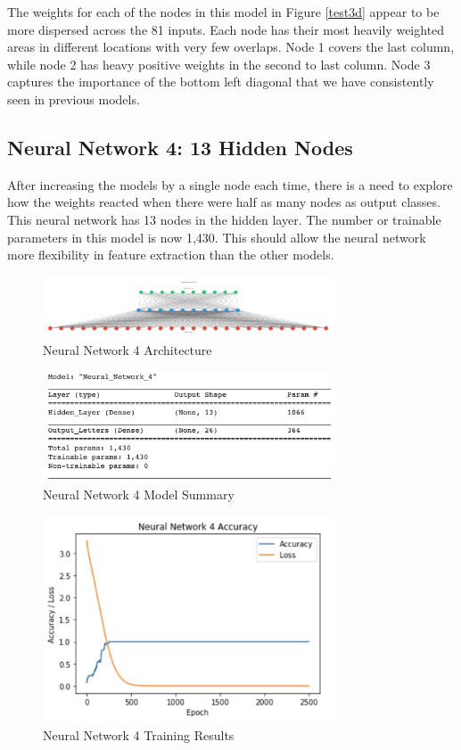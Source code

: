 \documentclass[5p,authoryear]{elsarticle}
\begin{document}
The weights for each of the nodes in this model in Figure \ref{test3d} appear to be more dispersed across the 81 inputs. 
Each node has their most heavily weighted areas in different locations with very few overlaps. 
Node 1 covers the last column, while node 2 has heavy positive weights in the second to last column. 
Node 3 captures the importance of the bottom left diagonal that we have consistently seen in previous models. 


\subsection{Neural Network 4: 13 Hidden Nodes}\label{one}

After increasing the models by a single node each time, there is a need to explore how the weights reacted when there were half as many nodes as output classes. 
This neural network has 13 nodes in the hidden layer. 
The number or trainable parameters in this model is now 1,430. 
This should allow the neural network more flexibility in feature extraction than the other models.

\begin{figure}[!htb] \centering
	\includegraphics[width=3.4in]{figures/nn4.pdf}
	\caption[]{Neural Network 4 Architecture} 
	\label{test4a} 
\end{figure}


\begin{figure}[!htb] \centering
	\includegraphics[width=3.4in]{figures/nn4 sum.png}
	\caption[]{Neural Network 4 Model Summary} 
	\label{test4b} 
\end{figure}

\begin{figure}[!htb] \centering
	\includegraphics[width=3.4in]{figures/nn4 plot.png}
	\caption[]{Neural Network 4 Training Results} 
	\label{test4c}
\end{figure}
\end{document}
